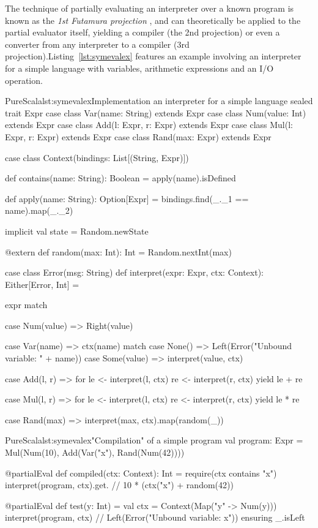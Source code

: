 \documentclass[a4paper,twoside]{article}
\newcommand{\RefCode}[1]{Listing~\ref{#1}}
\begin{document}
The technique of partially evaluating an interpreter over a known program is known as the \textit{1st Futamura projection} \cite{futamura}, and can theoretically be applied to the partial evaluator itself, yielding a compiler (the 2nd projection) or even a converter from any interpreter to a compiler (3rd projection).\RefCode{lst:symevalex} features an example involving an interpreter for a simple language with variables, arithmetic expressions and an I/O operation.

\begin{Code}{PureScala}{lst:symevalex}{Implementation an interpreter for a simple language}
sealed trait Expr
case class Var(name: String)     extends Expr
case class Num(value: Int)       extends Expr
case class Add(l: Expr, r: Expr) extends Expr
case class Mul(l: Expr, r: Expr) extends Expr
case class Rand(max: Expr)       extends Expr

case class Context(bindings: List[(String, Expr)]) {
  def contains(name: String): Boolean =
  	apply(name).isDefined

  def apply(name: String): Option[Expr] =
    bindings.find(_._1 == name).map(_._2)
}

implicit val state = Random.newState

@extern
def random(max: Int): Int = {
  Random.nextInt(max)
}

case class Error(msg: String)
def interpret(expr: Expr, ctx: Context): Either[Error, Int] = {
  expr match {
    case Num(value) => Right(value)

    case Var(name)  => ctx(name) match { 
      case None()      => Left(Error("Unbound variable: " + name))
      case Some(value) => interpret(value, ctx)
    }

    case Add(l, r)  => for {
      le <- interpret(l, ctx)
      re <- interpret(r, ctx)
    } yield le + re

    case Mul(l, r)  => for {
      le <- interpret(l, ctx)
      re <- interpret(r, ctx)
    } yield le * re

    case Rand(max) =>
      interpret(max, ctx).map(random(_))
  }
}
\end{Code}

\begin{Code}{PureScala}{lst:symevalex}{"Compilation" of a simple program}
val program: Expr = Mul(Num(10), Add(Var("x"), Rand(Num(42))))

@partialEval
def compiled(ctx: Context): Int = {
  require(ctx contains "x")
  interpret(program, ctx).get.            // 10 * (ctx("x") + random(42))
}

@partialEval
def test(y: Int) = {
  val ctx = Context(Map("y" -> Num(y)))
  interpret(program, ctx)                 // Left(Error("Unbound variable: x"))
} ensuring { _.isLeft }
\end{Code}
\end{document}
